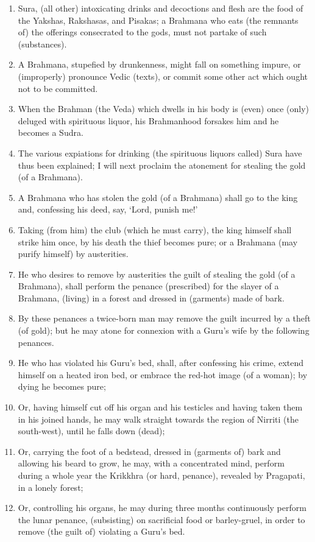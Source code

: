 \begin{enumerate}
\item Sura, (all other) intoxicating drinks and decoctions and flesh are the food of the Yakshas, Rakshasas, and Pisakas; a Brahmana who eats (the remnants of) the offerings consecrated to the gods, must not partake of such (substances).
\item A Brahmana, stupefied by drunkenness, might fall on something impure, or (improperly) pronounce Vedic (texts), or commit some other act which ought not to be committed.
\item When the Brahman (the Veda) which dwells in his body is (even) once (only) deluged with spirituous liquor, his Brahmanhood forsakes him and he becomes a Sudra.
\item The various expiations for drinking (the spirituous liquors called) Sura have thus been explained; I will next proclaim the atonement for stealing the gold (of a Brahmana).
\item A Brahmana who has stolen the gold (of a Brahmana) shall go to the king and, confessing his deed, say, `Lord, punish me!'
\item Taking (from him) the club (which he must carry), the king himself shall strike him once, by his death the thief becomes pure; or a Brahmana (may purify himself) by austerities.
\item He who desires to remove by austerities the guilt of stealing the gold (of a Brahmana), shall perform the penance (prescribed) for the slayer of a Brahmana, (living) in a forest and dressed in (garments) made of bark.
\item By these penances a twice-born man may remove the guilt incurred by a theft (of gold); but he may atone for connexion with a Guru's wife by the following penances.
\item He who has violated his Guru's bed, shall, after confessing his crime, extend himself on a heated iron bed, or embrace the red-hot image (of a woman); by dying he becomes pure;
\item Or, having himself cut off his organ and his testicles and having taken them in his joined hands, he may walk straight towards the region of Nirriti (the south-west), until he falls down (dead);
\item Or, carrying the foot of a bedstead, dressed in (garments of) bark and allowing his beard to grow, he may, with a concentrated mind, perform during a whole year the Krikkhra (or hard, penance), revealed by Pragapati, in a lonely forest;
\item Or, controlling his organs, he may during three months continuously perform the lunar penance, (subsisting) on sacrificial food or barley-gruel, in order to remove (the guilt of) violating a Guru's bed.

\end{enumerate}
